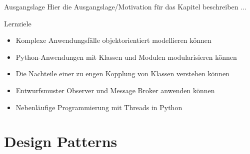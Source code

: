 \begin{frame}{Ausgangslage}
    Hier die Ausgangslage/Motivation für das Kapitel beschreiben ...

\end{frame}

\begin{frame}{Lernziele}
    \begin{itemize}
        \item Komplexe Anwendungsfälle objektorientiert modellieren können
        \item Python-Anwendungen mit Klassen und Modulen modularisieren können
        \item Die Nachteile einer zu engen Kopplung von Klassen verstehen können
        \item Entwurfsmuster Observer und Message Broker anwenden können
        \item Nebenläufige Programmierung mit Threads in Python
    \end{itemize}
\end{frame}


\section{Design Patterns}

